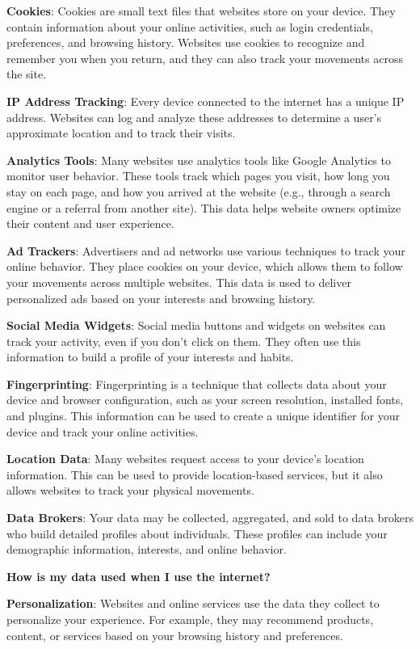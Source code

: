 \documentclass[
]{book}
\theoremstyle{definition}
\theoremstyle{definition}
\theoremstyle{definition}
\theoremstyle{definition}
\theoremstyle{remark}
\begin{document}
\textbf{Cookies}: Cookies are small text files that websites store on your device. They contain information about your online activities, such as login credentials, preferences, and browsing history. Websites use cookies to recognize and remember you when you return, and they can also track your movements across the site.

\textbf{IP Address Tracking}: Every device connected to the internet has a unique IP address. Websites can log and analyze these addresses to determine a user's approximate location and to track their visits.

\textbf{Analytics Tools}: Many websites use analytics tools like Google Analytics to monitor user behavior. These tools track which pages you visit, how long you stay on each page, and how you arrived at the website (e.g., through a search engine or a referral from another site). This data helps website owners optimize their content and user experience.

\textbf{Ad Trackers}: Advertisers and ad networks use various techniques to track your online behavior. They place cookies on your device, which allows them to follow your movements across multiple websites. This data is used to deliver personalized ads based on your interests and browsing history.

\textbf{Social Media Widgets}: Social media buttons and widgets on websites can track your activity, even if you don't click on them. They often use this information to build a profile of your interests and habits.

\textbf{Fingerprinting}: Fingerprinting is a technique that collects data about your device and browser configuration, such as your screen resolution, installed fonts, and plugins. This information can be used to create a unique identifier for your device and track your online activities.

\textbf{Location Data}: Many websites request access to your device's location information. This can be used to provide location-based services, but it also allows websites to track your physical movements.

\textbf{Data Brokers}: Your data may be collected, aggregated, and sold to data brokers who build detailed profiles about individuals. These profiles can include your demographic information, interests, and online behavior.

\textbf{How is my data used when I use the internet?}

\textbf{Personalization}: Websites and online services use the data they collect to personalize your experience. For example, they may recommend products, content, or services based on your browsing history and preferences.
\end{document}
